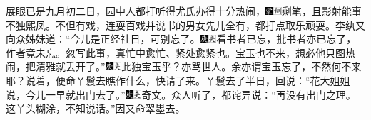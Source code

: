 展眼已是九月初二日，园中人都打听得尤氏办得十分热闹，{\includegraphics[width=3mm]{../Images/00006}\includegraphics[width=3mm]{../Images/00011}\footnotesize \kaishu 剩笔，且影射能事不独熙凤。}不但有戏，连耍百戏并说书的男女先儿全有，都打点取乐顽耍。李纨又向众姊妹道：“今儿是正经社日，可别忘了。{\includegraphics[width=3mm]{../Images/00004}\includegraphics[width=3mm]{../Images/00012}\footnotesize \kaishu 看书者已忘，批书者亦已忘了，作者竟未忘。忽写此事，真忙中愈忙、紧处愈紧也。}宝玉也不来，想必他只图热闹，把清雅就丢开了。”{\includegraphics[width=3mm]{../Images/00004}\includegraphics[width=3mm]{../Images/00012}\footnotesize \kaishu 此独宝玉乎？亦骂世人。余亦谓宝玉忘了，不然何不来耶？}说着，便命丫鬟去瞧作什么，快请了来。丫鬟去了半日，回说：“花大姐姐说，今儿一早就出门去了。”{\includegraphics[width=3mm]{../Images/00004}\includegraphics[width=3mm]{../Images/00012}\footnotesize \kaishu 奇文。}众人听了，都诧异说：“再没有出门之理。这丫头糊涂，不知说话。”因又命翠墨去。

